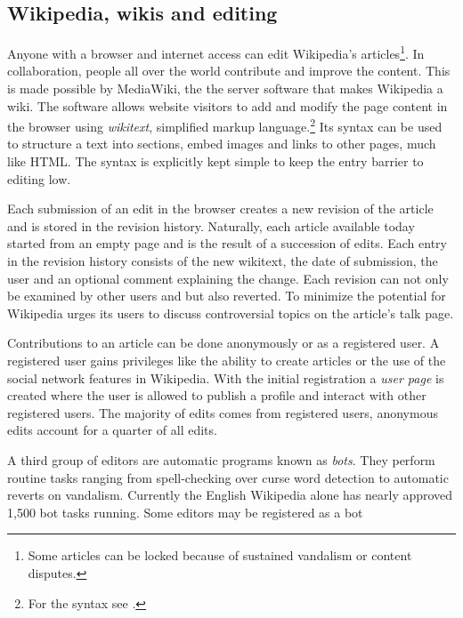\subsection{Wikipedia, wikis and editing}

Anyone with a browser and internet access can edit Wikipedia's articles\footnote{Some articles can be locked because of sustained vandalism or content disputes.\cite{wpprotectionpolicy}}.
In collaboration, people all over the world contribute and improve the content. 
This is made possible by MediaWiki, the the server software that makes Wikipedia a wiki. 
The software allows website visitors to add and modify the page content in the browser using \emph{wikitext}, simplified markup language.\footnote{For the syntax see .}
Its syntax can be used to structure a text into sections, embed images and links to other pages, much like HTML.
The syntax is explicitly kept simple to keep the entry barrier to editing low.

Each submission of an edit in the browser creates a new revision of the article and is stored in the revision history.
Naturally, each article available today started from an empty page and is the result of a succession of edits.
Each entry in the revision history consists of the new wikitext, the date of submission, the user and an optional comment explaining the change.
Each revision can not only be examined by other users and but also reverted.
To minimize the potential for \cite{suh2007us} Wikipedia urges its users to discuss controversial topics on the article's talk page.


Contributions to an article can be done anonymously or as a registered user.
A registered user gains privileges like the ability to create articles or the use of the social network features in Wikipedia.
With the initial registration a \emph{user page} is created where the user is allowed to publish a profile and interact with other registered users.\cite{wikiwhyaccount}
The majority of edits comes from registered users, anonymous edits account for a quarter of all edits.\cite{wpanonstats}

A third group of editors are automatic programs known as \emph{bots}.
They perform routine tasks ranging from spell-checking over curse word detection to automatic reverts on vandalism.
Currently the English Wikipedia alone has nearly approved 1,500 bot tasks running.\cite{wpbots}
Some editors may be registered as a bot


